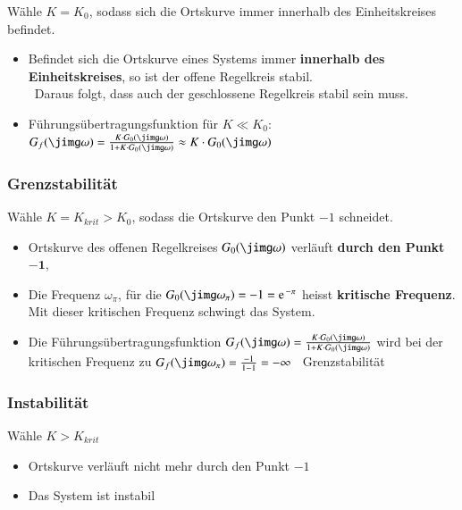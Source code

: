 Wähle $K = K_0$, sodass sich die Ortskurve immer innerhalb des Einheitskreises befindet.
\vspace{0.1cm}
\begin{itemize}
    \item Befindet sich die Ortskurve eines Systems immer \textbf{innerhalb des Einheitskreises}, so ist der offene Regelkreis stabil. \\
        \textrightarrow\ Daraus folgt, dass auch der geschlossene Regelkreis stabil sein muss.
    \item Führungsübertragungsfunktion für $K \ll K_0$:\\
    $G_f(\jimg \omega) = \frac{K \cdot G_0(\jimg \omega)}{1 + K \cdot G_0(\jimg \omega)} \approx K \cdot G_0(\jimg \omega)$ 
\end{itemize}


\subsubsection{Grenzstabilität}

Wähle $K = K_{krit} > K_0$, sodass die Ortskurve den Punkt $-1$ schneidet.
\vspace{0.1cm}
\begin{itemize}
    \item Ortskurve des offenen Regelkreises $G_0(\jimg \omega)$ verläuft \textbf{durch den Punkt $\boldsymbol{-1}$}, 
    \item Die Frequenz $\omega_{\pi}$, für die $G_0(\jimg \omega_{\pi})= -1 = \e^{- \pi}$ heisst \textbf{kritische Frequenz}. Mit dieser 
        kritischen Frequenz schwingt das System.
    \item Die Führungsübertragungsfunktion $G_f(\jimg \omega) = \frac { K \cdot G_0(\jimg \omega)}{1 + K \cdot G_0(\jimg \omega)}$ wird bei 
    der kritischen Frequenz zu $G_f(\jimg \omega_{\pi}) = \frac{-1}{1-1} = - \infty $ \textrightarrow\ Grenzstabilität
\end{itemize}


\subsubsection{Instabilität}

Wähle $K > K_{krit}$
\vspace{0.1cm}
\begin{itemize}
    \item Ortskurve verläuft nicht mehr durch den Punkt $-1$
    \item Das System ist instabil
\end{itemize}


